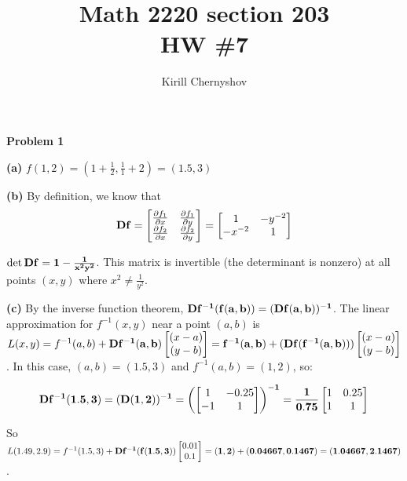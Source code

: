 \documentclass[11pt]{amsart}
\newcommand{\name}{Kirill Chernyshov}
\newcommand{\sectionnum}{203}
\newcommand{\hwnumber}{7}
\DeclareMathOperator{\detm}{det}
\newcommand{\problem}[1]{\bigskip\noindent\textbf{Problem #1}}
\newcommand{\ppart}[1]{\bigskip\textbf{(#1)}}
\begin{document}
\title{Math 2220 section \sectionnum\\ HW \#\hwnumber}
\author{\name}
\maketitle


\problem{1}

\ppart{a}
$f(1, 2) = \left(1 + \frac{1}{2}, \frac{1}{1} + 2\right) = (1.5, 3)$

\ppart{b}
By definition, we know that
$$
\bf{D}f =
\begin{bmatrix}
	\frac{\partial f_1}{\partial x} & \frac{\partial f_1}{\partial y} \\
	\frac{\partial f_2}{\partial x} & \frac{\partial f_2}{\partial y}
\end{bmatrix}
=
\begin{bmatrix}
	1  & -y^{-2} \\
	-x^{-2} & 1
\end{bmatrix}
$$

$\detm \bf{D}f = 1 - \frac{1}{x^2y^2}$. This matrix is invertible (the determinant is nonzero) at all points $(x, y)$ where $x^2 \neq \frac{1}{y^2}$.

\ppart{c}
By the inverse function theorem, $\bf{D}f^{-1}(f(a, b)) = (\bf{D}f(a, b))^{-1}$. The linear approximation for $f^{-1}(x, y)$ near a point $(a, b)$ is $L(x, y) = f^{-1}(a, b) + \bf{D}f^{-1}(a, b) \begin{bmatrix}(x - a) \\ (y - b)\end{bmatrix} = f^{-1}(a, b) + (\bf{D}f(f^{-1}(a, b))) \begin{bmatrix}(x - a) \\ (y - b)\end{bmatrix}$. In this case, $(a, b) = (1.5, 3)$ and $f^{-1}(a, b) = (1, 2)$, so:

$$
\bf{D}f^{-1}(1.5, 3) = (\bf{D}(1, 2))^{-1} =
\left(\begin{bmatrix}
	1 & -0.25 \\
	-1 & 1
\end{bmatrix}\right)^{-1}
=
\frac{1}{0.75}
\begin{bmatrix}
	1 & 0.25 \\
	1 & 1
\end{bmatrix}
$$

So $L(1.49, 2.9) = f^{-1}(1.5, 3) + \bf{D}f^{-1}(f(1.5, 3)) \begin{bmatrix}0.01 \\ 0.1\end{bmatrix} = (1, 2) + (0.04667, 0.1467) = (1.04667, 2.1467)$.
\end{document}
